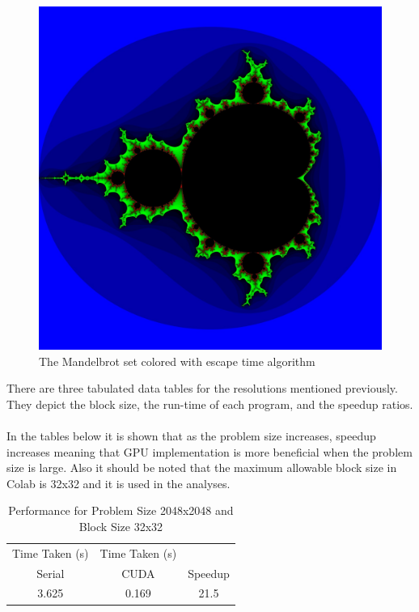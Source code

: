 \documentclass[12pt]{article}
\begin{document}
\begin{figure}[H]
    \centering
    \includegraphics[scale=0.17]{mandelbrot.jpg}
    \caption{The Mandelbrot set colored with escape time algorithm}
    \label{comms}
\end{figure}
\newpage
\noindent
There are three tabulated data tables for the resolutions mentioned previously. They depict the block size, the run-time of each program, and the speedup ratios.\\\\
In the tables below it is shown that as the problem size increases, speedup increases meaning that GPU implementation is more beneficial when the problem size is large. Also it should be noted that the maximum allowable block size in Colab is 32x32 and it is used in the analyses. 

\begin{table}[h]
\centering
\caption{Performance for Problem Size 2048x2048 and Block Size 32x32}
\label{tab:2}
\begin{tabular}{@{} ccc @{}}
\toprule
Time Taken (s) & Time Taken (s) & \\
Serial & CUDA & Speedup\\
\midrule
3.625 & 0.169 & 21.5 \\
\bottomrule
\end{tabular}
\end{table}
\end{document}
